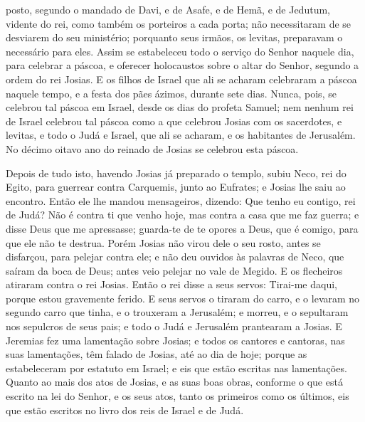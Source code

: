 posto, segundo o mandado de Davi, e de Asafe, e de Hemã, e de
Jedutum, vidente do rei, como também os porteiros a cada porta; não
necessitaram de se desviarem do seu ministério; porquanto seus
irmãos, os levitas, preparavam o necessário para eles. Assim
se estabeleceu todo o serviço do Senhor naquele dia, para celebrar a
páscoa, e oferecer holocaustos sobre o altar do Senhor, segundo a
ordem do rei Josias. E os filhos de Israel que ali se acharam
celebraram a páscoa naquele tempo, e a festa dos pães ázimos,
durante sete dias. Nunca, pois, se celebrou tal páscoa em
Israel, desde os dias do profeta Samuel; nem nenhum rei de Israel
celebrou tal páscoa como a que celebrou Josias com os sacerdotes, e
levitas, e todo o Judá e Israel, que ali se acharam, e os habitantes
de Jerusalém. No décimo oitavo ano do reinado de Josias se
celebrou esta páscoa.

Depois de tudo isto, havendo Josias já preparado o templo, subiu
Neco, rei do Egito, para guerrear contra Carquemis, junto ao
Eufrates; e Josias lhe saiu ao encontro. Então ele lhe mandou
mensageiros, dizendo: Que tenho eu contigo, rei de Judá? Não é
contra ti que venho hoje, mas contra a casa que me faz guerra; e
disse Deus que me apressasse; guarda-te de te opores a Deus, que é
comigo, para que ele não te destrua. Porém Josias não virou
dele o seu rosto, antes se disfarçou, para pelejar contra ele; e não
deu ouvidos às palavras de Neco, que saíram da boca de Deus; antes
veio pelejar no vale de Megido. E os flecheiros atiraram
contra o rei Josias. Então o rei disse a seus servos: Tirai-me
daqui, porque estou gravemente ferido. E seus servos o
tiraram do carro, e o levaram no segundo carro que tinha, e o
trouxeram a Jerusalém; e morreu, e o sepultaram nos sepulcros de
seus pais; e todo o Judá e Jerusalém prantearam a Josias. E
Jeremias fez uma lamentação sobre Josias; e todos os cantores e
cantoras, nas suas lamentações, têm falado de Josias, até ao dia de
hoje; porque as estabeleceram por estatuto em Israel; e eis que
estão escritas nas lamentações. Quanto ao mais dos atos de
Josias, e as suas boas obras, conforme o que está escrito na lei do
Senhor, e os seus atos, tanto os primeiros como os últimos,
eis que estão escritos no livro dos reis de Israel e de Judá.

\medskip

